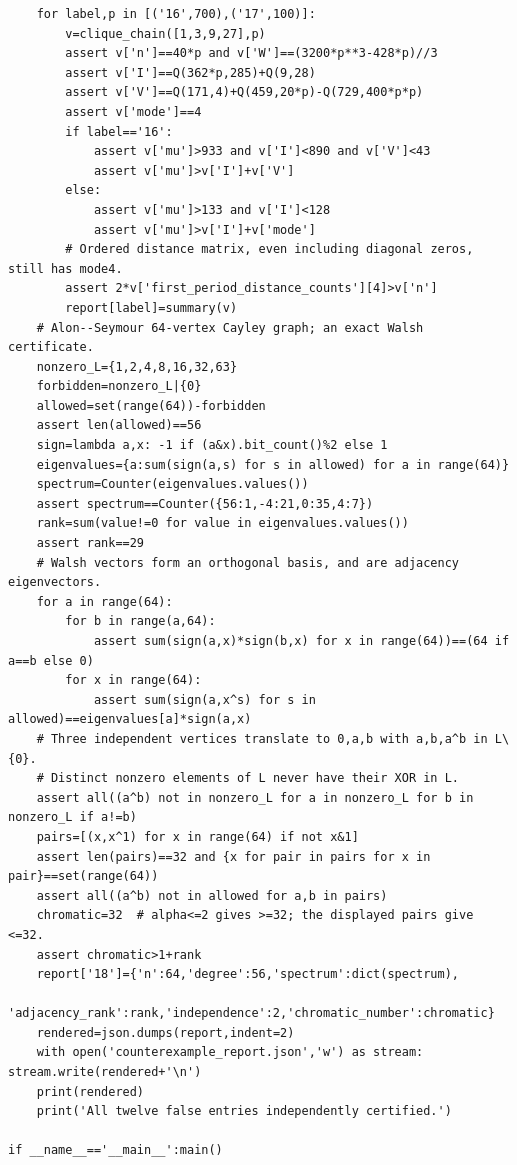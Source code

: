 \documentclass[11pt,a4paper]{article}
\theoremstyle{remark}\newtheorem{remark}[theorem]{Remark}
\begin{document}
\begin{lstlisting}
    for label,p in [('16',700),('17',100)]:
        v=clique_chain([1,3,9,27],p)
        assert v['n']==40*p and v['W']==(3200*p**3-428*p)//3
        assert v['I']==Q(362*p,285)+Q(9,28)
        assert v['V']==Q(171,4)+Q(459,20*p)-Q(729,400*p*p)
        assert v['mode']==4
        if label=='16':
            assert v['mu']>933 and v['I']<890 and v['V']<43
            assert v['mu']>v['I']+v['V']
        else:
            assert v['mu']>133 and v['I']<128
            assert v['mu']>v['I']+v['mode']
        # Ordered distance matrix, even including diagonal zeros, still has mode4.
        assert 2*v['first_period_distance_counts'][4]>v['n']
        report[label]=summary(v)
    # Alon--Seymour 64-vertex Cayley graph; an exact Walsh certificate.
    nonzero_L={1,2,4,8,16,32,63}
    forbidden=nonzero_L|{0}
    allowed=set(range(64))-forbidden
    assert len(allowed)==56
    sign=lambda a,x: -1 if (a&x).bit_count()%2 else 1
    eigenvalues={a:sum(sign(a,s) for s in allowed) for a in range(64)}
    spectrum=Counter(eigenvalues.values())
    assert spectrum==Counter({56:1,-4:21,0:35,4:7})
    rank=sum(value!=0 for value in eigenvalues.values())
    assert rank==29
    # Walsh vectors form an orthogonal basis, and are adjacency eigenvectors.
    for a in range(64):
        for b in range(a,64):
            assert sum(sign(a,x)*sign(b,x) for x in range(64))==(64 if a==b else 0)
        for x in range(64):
            assert sum(sign(a,x^s) for s in allowed)==eigenvalues[a]*sign(a,x)
    # Three independent vertices translate to 0,a,b with a,b,a^b in L\{0}.
    # Distinct nonzero elements of L never have their XOR in L.
    assert all((a^b) not in nonzero_L for a in nonzero_L for b in nonzero_L if a!=b)
    pairs=[(x,x^1) for x in range(64) if not x&1]
    assert len(pairs)==32 and {x for pair in pairs for x in pair}==set(range(64))
    assert all((a^b) not in allowed for a,b in pairs)
    chromatic=32  # alpha<=2 gives >=32; the displayed pairs give <=32.
    assert chromatic>1+rank
    report['18']={'n':64,'degree':56,'spectrum':dict(spectrum),
                  'adjacency_rank':rank,'independence':2,'chromatic_number':chromatic}
    rendered=json.dumps(report,indent=2)
    with open('counterexample_report.json','w') as stream: stream.write(rendered+'\n')
    print(rendered)
    print('All twelve false entries independently certified.')

if __name__=='__main__':main()
\end{lstlisting}
\end{document}
